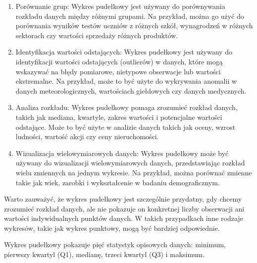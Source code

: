 \documentclass[
  polish,
  letterpaper,
  DIV=11,
  numbers=noendperiod]{scrreprt}
\begin{document}
\begin{enumerate}
\def\labelenumi{\arabic{enumi}.}
\item
  Porównanie grup: Wykres pudełkowy jest używany do porównywania
  rozkładu danych między różnymi grupami. Na przykład, można go użyć do
  porównania wyników testów uczniów z różnych szkół, wynagrodzeń w
  różnych sektorach czy wartości sprzedaży różnych produktów.
\item
  Identyfikacja wartości odstających: Wykres pudełkowy jest używany do
  identyfikacji wartości odstających (outlierów) w danych, które mogą
  wskazywać na błędy pomiarowe, nietypowe obserwacje lub wartości
  ekstremalne. Na przykład, może to być użyte do wykrywania anomalii w
  danych meteorologicznych, wartościach giełdowych czy danych
  medycznych.
\item
  Analiza rozkładu: Wykres pudełkowy pomaga zrozumieć rozkład danych,
  takich jak mediana, kwartyle, zakres wartości i potencjalne wartości
  odstające. Może to być użyte w analizie danych takich jak oceny,
  wzrost ludności, wartość akcji czy ceny nieruchomości.
\item
  Wizualizacja wielowymiarowych danych: Wykres pudełkowy może być
  używany do wizualizacji wielowymiarowych danych, przedstawiając
  rozkład wielu zmiennych na jednym wykresie. Na przykład, można
  porównać zmienne takie jak wiek, zarobki i wykształcenie w badaniu
  demograficznym.
\end{enumerate}

Warto zauważyć, że wykres pudełkowy jest szczególnie przydatny, gdy
chcemy zrozumieć rozkład danych, ale nie pokazuje on konkretnej liczby
obserwacji ani wartości indywidualnych punktów danych. W takich
przypadkach inne rodzaje wykresów, takie jak wykres punktowy, mogą być
bardziej odpowiednie.

Wykres pudełkowy pokazuje pięć statystyk opisowych danych: minimum,
pierwszy kwartyl (Q1), medianę, trzeci kwartyl (Q3) i maksimum.
\end{document}
